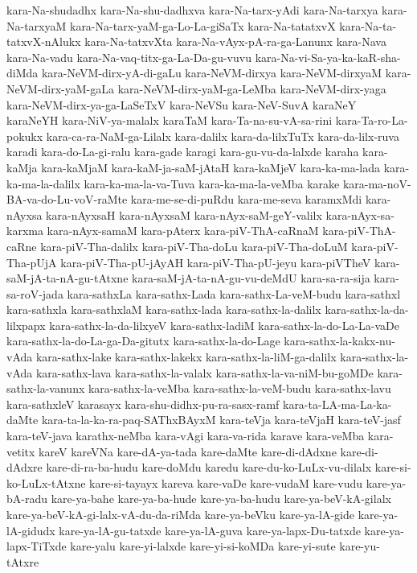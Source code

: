 {kara-Na-shudadhx
kara-Na-shu-dadhxva
kara-Na-tarx-yAdi
kara-Na-tarxya
kara-Na-tarxyaM
kara-Na-tarx-yaM-ga-Lo-La-giSaTx
kara-Na-tatatxvX
kara-Na-ta-tatxvX-nAlukx
kara-Na-tatxvXta
kara-Na-vAyx-pA-ra-ga-Lanunx
kara-Nava
kara-Na-vadu
kara-Na-vaq-titx-ga-La-Da-gu-vuvu
kara-Na-vi-Sa-ya-ka-kaR-sha-diMda
kara-NeVM-dirx-yA-di-gaLu
kara-NeVM-dirxya
kara-NeVM-dirxyaM
kara-NeVM-dirx-yaM-gaLa
kara-NeVM-dirx-yaM-ga-LeMba
kara-NeVM-dirx-yaga
kara-NeVM-dirx-ya-ga-LaSeTxV
kara-NeVSu
kara-NeV-SuvA
karaNeY
karaNeYH
kara-NiV-ya-malalx
karaTaM
kara-Ta-na-su-vA-sa-rini
kara-Ta-ro-La-pokukx
kara-ca-ra-NaM-ga-Lilalx
kara-dalilx
kara-da-lilxTuTx
kara-da-lilx-ruva
karadi
kara-do-La-gi-ralu
kara-gade
karagi
kara-gu-vu-da-lalxde
karaha
kara-kaMja
kara-kaMjaM
kara-kaM-ja-saM-jAtaH
kara-kaMjeV
kara-ka-ma-lada
kara-ka-ma-la-dalilx
kara-ka-ma-la-va-Tuva
kara-ka-ma-la-veMba
karake
kara-ma-noV-BA-va-do-Lu-voV-raMte
kara-me-se-di-puRdu
kara-me-seva
karamxMdi
kara-nAyxsa
kara-nAyxsaH
kara-nAyxsaM
kara-nAyx-saM-geY-valilx
kara-nAyx-sa-karxma
kara-nAyx-samaM
kara-pAterx
kara-piV-ThA-caRnaM
kara-piV-ThA-caRne
kara-piV-Tha-dalilx
kara-piV-Tha-doLu
kara-piV-Tha-doLuM
kara-piV-Tha-pUjA
kara-piV-Tha-pU-jAyAH
kara-piV-Tha-pU-jeyu
kara-piVTheV
kara-saM-jA-ta-nA-gu-tAtxne
kara-saM-jA-ta-nA-gu-vu-deMdU
kara-sa-ra-sija
kara-sa-roV-jada
kara-sathxLa
kara-sathx-Lada
kara-sathx-La-veM-budu
kara-sathxl
kara-sathxla
kara-sathxlaM
kara-sathx-lada
kara-sathx-la-dalilx
kara-sathx-la-da-lilxpapx
kara-sathx-la-da-lilxyeV
kara-sathx-ladiM
kara-sathx-la-do-La-La-vaDe
kara-sathx-la-do-La-ga-Da-gitutx
kara-sathx-la-do-Lage
kara-sathx-la-kakx-nu-vAda
kara-sathx-lake
kara-sathx-lakekx
kara-sathx-la-liM-ga-dalilx
kara-sathx-la-vAda
kara-sathx-lava
kara-sathx-la-valalx
kara-sathx-la-va-niM-bu-goMDe
kara-sathx-la-vanunx
kara-sathx-la-veMba
kara-sathx-la-veM-budu
kara-sathx-lavu
kara-sathxleV
karasayx
kara-shu-didhx-pu-ra-sasx-ramf
kara-ta-LA-ma-La-ka-daMte
kara-ta-la-ka-ra-paq-SAThxBAyxM
kara-teVja
kara-teVjaH
kara-teV-jasf
kara-teV-java
karathx-neMba
kara-vAgi
kara-va-rida
karave
kara-veMba
kara-vetitx
kareV
kareVNa
kare-dA-ya-tada
kare-daMte
kare-di-dAdxne
kare-di-dAdxre
kare-di-ra-ba-hudu
kare-doMdu
karedu
kare-du-ko-LuLx-vu-dilalx
kare-si-ko-LuLx-tAtxne
kare-si-tayayx
kareva
kare-vaDe
kare-vudaM
kare-vudu
kare-ya-bA-radu
kare-ya-bahe
kare-ya-ba-hude
kare-ya-ba-hudu
kare-ya-beV-kA-gilalx
kare-ya-beV-kA-gi-lalx-vA-du-da-riMda
kare-ya-beVku
kare-ya-lA-gide
kare-ya-lA-gidudx
kare-ya-lA-gu-tatxde
kare-ya-lA-guva
kare-ya-lapx-Du-tatxde
kare-ya-lapx-TiTxde
kare-yalu
kare-yi-lalxde
kare-yi-si-koMDa
kare-yi-sute
kare-yu-tAtxre
}
